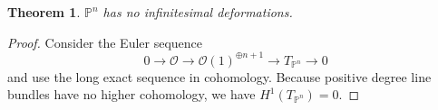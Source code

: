 \documentclass[leqno, openany]{memoir}
\newtheorem{thm}{Theorem}[section]
\theoremstyle{definition}
\theoremstyle{remark}
\theoremstyle{plain}
\theoremstyle{definition}
\theoremstyle{remark}
\renewcommand{\P}{\mathbb{P}}
\newcommand{\mc}[1]{\mathcal{#1}}
\begin{document}
\begin{thm}
    $\P^n$ has no infinitesimal deformations.
\end{thm}

\begin{proof}
    Consider the Euler sequence
    \[ 0 \to \mc{O} \to {\mc{O}(1)}^{\oplus n+1} \to T_{\P^n} \to 0 \]
    and use the long exact sequence in cohomology. Because positive degree line bundles have no higher cohomology, we have $H^1(T_{\P^n}) = 0$.
\end{proof}
\end{document}
